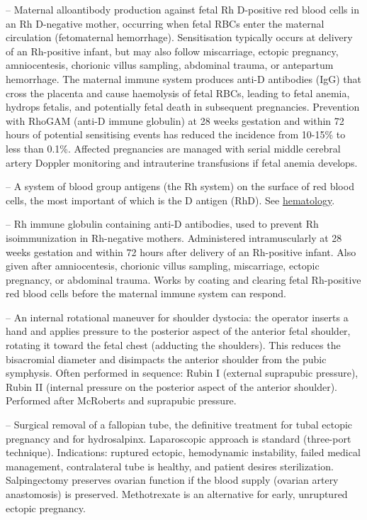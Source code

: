-- Maternal alloantibody production against fetal Rh D-positive red blood cells in an Rh D-negative mother, occurring when fetal RBCs enter the maternal circulation (fetomaternal hemorrhage). Sensitisation typically occurs at delivery of an Rh-positive infant, but may also follow miscarriage, ectopic pregnancy, amniocentesis, chorionic villus sampling, abdominal trauma, or antepartum hemorrhage. The maternal immune system produces anti-D antibodies (IgG) that cross the placenta and cause haemolysis of fetal RBCs, leading to fetal anemia, hydrops fetalis, and potentially fetal death in subsequent pregnancies. Prevention with RhoGAM (anti-D immune globulin) at 28 weeks gestation and within 72 hours of potential sensitising events has reduced the incidence from 10-15\% to less than 0.1\%. Affected pregnancies are managed with serial middle cerebral artery Doppler monitoring and intrauterine transfusions if fetal anemia develops.

-- A system of blood group antigens (the Rh system) on the surface of red blood cells, the most important of which is the D antigen (RhD). See \hyperlink{hematology}{hematology}.

-- Rh immune globulin containing anti-D antibodies, used to prevent Rh isoimmunization in Rh-negative mothers. Administered intramuscularly at 28 weeks gestation and within 72 hours after delivery of an Rh-positive infant. Also given after amniocentesis, chorionic villus sampling, miscarriage, ectopic pregnancy, or abdominal trauma. Works by coating and clearing fetal Rh-positive red blood cells before the maternal immune system can respond.

-- An internal rotational maneuver for shoulder dystocia: the operator inserts a hand and applies pressure to the posterior aspect of the anterior fetal shoulder, rotating it toward the fetal chest (adducting the shoulders). This reduces the bisacromial diameter and disimpacts the anterior shoulder from the pubic symphysis. Often performed in sequence: Rubin I (external suprapubic pressure), Rubin II (internal pressure on the posterior aspect of the anterior shoulder). Performed after McRoberts and suprapubic pressure.

-- Surgical removal of a fallopian tube, the definitive treatment for tubal ectopic pregnancy and for hydrosalpinx. Laparoscopic approach is standard (three-port technique). Indications: ruptured ectopic, hemodynamic instability, failed medical management, contralateral tube is healthy, and patient desires sterilization. Salpingectomy preserves ovarian function if the blood supply (ovarian artery anastomosis) is preserved. Methotrexate is an alternative for early, unruptured ectopic pregnancy.

